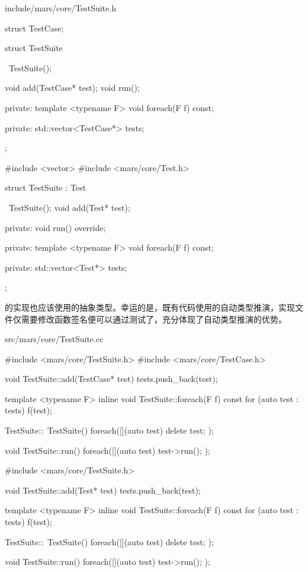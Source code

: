 \begin{content}
\begin{diff}{include/mars/core/TestSuite.h}
\begin{minicpp}
struct TestCase;

struct TestSuite {
  ~TestSuite();

  void add(TestCase* test);
  void run();

private:
  template <typename F>
  void foreach(F f) const;

private:
  std::vector<TestCase*> tests;
};
 \end{minicpp}
\tcblower
 \begin{minicpp}
#include <vector>
#include <mars/core/Test.h>

struct TestSuite : Test {
  ~TestSuite();
  void add(Test* test);

private:
  void run() override;

private:
  template <typename F>
  void foreach(F f) const;

private:
  std::vector<Test*> tests;
};
 \end{minicpp}
\end{diff}

的实现也应该使用的抽象类型。幸运的是，既有代码使用的自动类型推演，实现文件仅需要修改函数签名便可以通过测试了，充分体现了自动类型推演的优势。

\begin{diff}{src/mars/core/TestSuite.cc}
 \begin{minicpp}
#include <mars/core/TestSuite.h>
#include <mars/core/TestCase.h>

void TestSuite::add(TestCase* test) {
  tests.push_back(test);
}

template <typename F>
inline void TestSuite::foreach(F f) const {
  for (auto test : tests) {
    f(test);
  }
}

TestSuite::~TestSuite() {
  foreach([](auto test) {
    delete test;
  });
}

void TestSuite::run() {
  foreach([](auto test) {
    test->run();
  });
} 
 \end{minicpp}
\tcblower
 \begin{minicpp}
#include <mars/core/TestSuite.h>

void TestSuite::add(Test* test) {
  tests.push_back(test);
}

template <typename F>
inline void TestSuite::foreach(F f) const {
  for (auto test : tests) {
    f(test);
  }
}

TestSuite::~TestSuite() {
  foreach([](auto test) {
    delete test;
  });
}

void TestSuite::run() {
  foreach([](auto test) {
    test->run();
  });
}
 \end{minicpp}
\end{diff}


\end{content}
